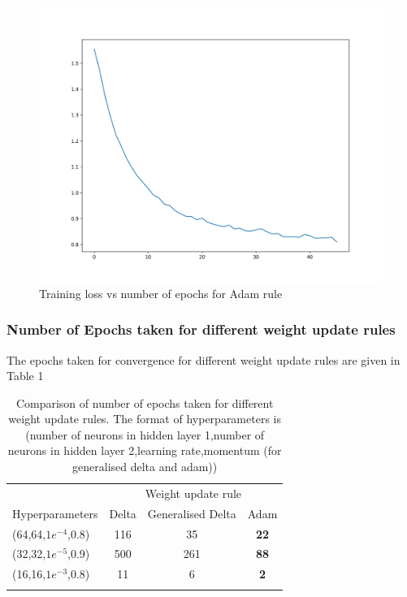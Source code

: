 \documentclass[10pt,a4paper]{article}
\begin{document}
\begin{figure}%
    \centering
    \includegraphics[scale=0.4]{ada_training_loss_0.0001.png}%
    \caption{Training loss vs number of epochs for Adam rule}%
    \label{fig:17}%
\end{figure}


\subsubsection{Number of Epochs taken for different weight update rules}

The epochs taken for convergence for different weight update rules are given in Table 1

\begin{table}[H]
    \centering
\begin{tabular}{l*{3}{c}}
    \toprule
    & \multicolumn{3}{c}{Weight update rule} \\
    \cmidrule(lr){2-4}
    Hyperparameters & Delta & Generalised Delta & Adam \\
    \cmidrule(lr){1-1}
    \cmidrule(lr){2-4}
    (64,64,$1e^{-4}$,0.8) & 116 & 35 & \textbf{22} \\
    (32,32,$1e^{-5}$,0.9) & 500 & 261 & \textbf{88} \\
    (16,16,$1e^{-3}$,0.8) & 11 & 6 & \textbf{2} \\
    \bottomrule
    \label{table1}

    \end{tabular}
    \caption{Comparison of number of epochs taken for different weight update rules. The format of hyperparameters is (number of neurons in hidden layer 1,number of neurons in hidden layer 2,learning rate,momentum (for generalised delta and adam))}
\end{table}
\end{document}
